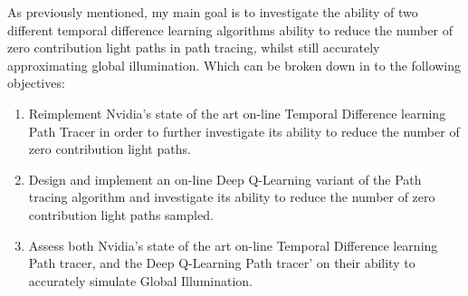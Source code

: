 \documentclass[../dissertation.tex]{subfiles}
\begin{document}
As previously mentioned, my main goal is to investigate the ability of two 
different temporal difference learning algorithms ability to reduce the number 
of zero contribution light paths in path tracing, whilst still accurately 
approximating global illumination. Which can be broken down in to the 
following objectives:

\begin{enumerate}
\item Reimplement Nvidia's state of the art on-line Temporal 
Difference learning Path Tracer in order to further investigate its ability
to reduce the number of zero contribution light paths.

\item Design and implement an on-line Deep Q-Learning variant of the
Path tracing algorithm and investigate its ability to reduce the number of zero contribution light paths sampled.

\item Assess both Nvidia's state of the art on-line Temporal Difference 
learning Path tracer, and the Deep Q-Learning Path tracer' on their ability 
to accurately simulate Global Illumination.

\end{enumerate}
\end{document}
